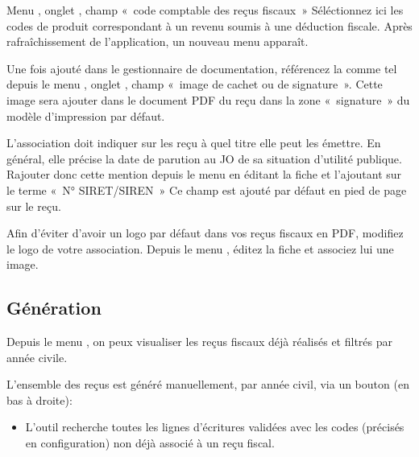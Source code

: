 \documentclass[a4paper,10pt,oneside,french]{sphinxmanual}
\begin{document}
Menu , onglet , champ « code comptable des reçus fiscaux »
Séléctionnez ici les codes de produit correspondant à un revenu soumis à une déduction fiscale.
Après rafraîchissement de l’application, un nouveau menu  apparaît.

Une fois ajouté dans le gestionnaire de documentation, référencez la comme tel depuis le menu , onglet , champ « image de cachet ou de signature ».
Cette image sera ajouter dans le document PDF du reçu dans la zone « signature » du modèle d’impression par défaut.

L’association doit indiquer sur les reçu à quel titre elle peut les émettre.
En général, elle précise la date de parution au JO de sa situation d’utilité publique.
Rajouter donc cette mention depuis le menu  en éditant la fiche et l’ajoutant sur le terme « N° SIRET/SIREN »
Ce champ est ajouté par défaut en pied de page sur le reçu.

Afin d’éviter d’avoir un logo par défaut dans vos reçus fiscaux en PDF, modifiez le logo de votre association.
Depuis le menu , éditez la fiche et associez lui une image.


\subsection{Génération}
\label{\detokenize{member/taxreceipt:generation}}
Depuis le menu , on peux visualiser les reçus fiscaux déjà réalisés et filtrés par année civile.
\begin{quote}

\noindent{}
\end{quote}

L’ensemble des reçus est généré manuellement, par année civil, via un bouton  (en bas à droite):
\begin{itemize}
\item {} 
L’outil recherche toutes les lignes d’écritures validées avec les codes (précisés en configuration) non déjà associé à un reçu fiscal.

\end{itemize}
\end{document}
